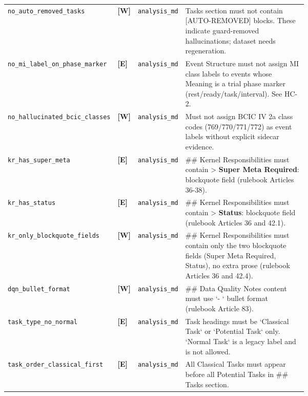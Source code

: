 \begin{tcolorbox}
\begin{tabular}{@{}p{0.22\linewidth}ll p{0.46\linewidth}@{}}
\addlinespace[1pt]
\texttt{no\_\allowbreak{}auto\_\allowbreak{}removed\_\allowbreak{}tasks} & \textbf{[W]} & \texttt{analysis\_md} & Tasks section must not contain [AUTO-REMOVED] blocks. These indicate guard-removed hallucinations; dataset needs regeneration. \\
\addlinespace[1pt]
\texttt{no\_\allowbreak{}mi\_\allowbreak{}label\_\allowbreak{}on\_\allowbreak{}phase\_\allowbreak{}marker} & \textbf{[E]} & \texttt{analysis\_md} & Event Structure must not assign MI class labels to events whose Meaning is a trial phase marker (rest/ready/task/interval). See HC-2. \\
\addlinespace[1pt]
\texttt{no\_\allowbreak{}hallucinated\_\allowbreak{}bcic\_\allowbreak{}classes} & \textbf{[W]} & \texttt{analysis\_md} & Must not assign BCIC IV 2a class codes (769/770/771/772) as event labels without explicit sidecar evidence. \\
\addlinespace[1pt]
\texttt{kr\_\allowbreak{}has\_\allowbreak{}super\_\allowbreak{}meta} & \textbf{[E]} & \texttt{analysis\_md} & \#\# Kernel Responsibilities must contain > \textbf{Super Meta Required}: blockquote field (rulebook Articles 36-38). \\
\addlinespace[1pt]
\texttt{kr\_\allowbreak{}has\_\allowbreak{}status} & \textbf{[E]} & \texttt{analysis\_md} & \#\# Kernel Responsibilities must contain > \textbf{Status}: blockquote field (rulebook Articles 36 and 42.1). \\
\addlinespace[1pt]
\texttt{kr\_\allowbreak{}only\_\allowbreak{}blockquote\_\allowbreak{}fields} & \textbf{[W]} & \texttt{analysis\_md} & \#\# Kernel Responsibilities must contain only the two blockquote fields (Super Meta Required, Status), no extra prose (rulebook Articles 36 and 42.4). \\
\addlinespace[1pt]
\texttt{dqn\_\allowbreak{}bullet\_\allowbreak{}format} & \textbf{[W]} & \texttt{analysis\_md} & \#\# Data Quality Notes content must use `- ` bullet format (rulebook Article 83). \\
\addlinespace[1pt]
\texttt{task\_\allowbreak{}type\_\allowbreak{}no\_\allowbreak{}normal} & \textbf{[E]} & \texttt{analysis\_md} & Task headings must be `Classical Task` or `Potential Task` only. `Normal Task` is a legacy label and is not allowed. \\
\addlinespace[1pt]
\texttt{task\_\allowbreak{}order\_\allowbreak{}classical\_\allowbreak{}first} & \textbf{[E]} & \texttt{analysis\_md} & All Classical Tasks must appear before all Potential Tasks in \#\# Tasks section. \\

\end{tabular}
\end{tcolorbox}

